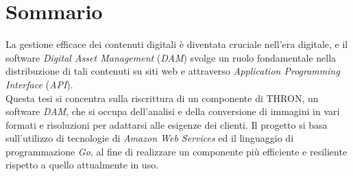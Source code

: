 \cleardoublepage
{}
{}
\begingroup
\let\clearpage\relax
\let\cleardoublepage\relax
\let\cleardoublepage\relax

\chapter*{Sommario}

La gestione efficace dei contenuti digitali è diventata cruciale nell'era
digitale, e il software \textit{Digital Asset Management} (\textit{DAM}) svolge un ruolo
fondamentale nella distribuzione di tali contenuti su siti web e attraverso
\textit{Application Programming Interface} (\textit{API}). \\
Questa tesi si concentra sulla riscrittura di un componente di THRON, un
software \textit{DAM}, che si occupa dell'analisi e della conversione di immagini in vari
formati e risoluzioni per adattarsi alle esigenze dei clienti.
Il progetto si basa sull'utilizzo di tecnologie di \textit{Amazon Web Services} ed il
linguaggio di programmazione \textit{Go},
al fine di realizzare un componente più efficiente e resiliente rispetto a quello attualmente in uso.



\endgroup

\vfill
